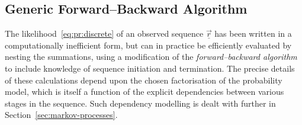\documentclass[a4paper]{article}
\newcommand{\vr}{\vec{r}}
\newcommand{\uvr}{\underline{\vr}}
\begin{document}
\subsection{Generic Forward--Backward Algorithm}
\label{sec:forward-backward-basic}

The likelihood~\eqref{eq:pr:discrete} of an observed sequence $\uvr$ has been written in a computationally inefficient form,
but can in practice be efficiently evaluated by nesting the summations, using a modification of the {\em forward--backward algorithm} to include knowledge of
sequence initiation and termination.
The precise details of these calculations depend upon the chosen factorisation of the probability model, which is itself a function of
the explicit dependencies between various stages in the sequence. Such dependency modelling is dealt with further in Section~\ref{sec:markov-processes}.
\end{document}
